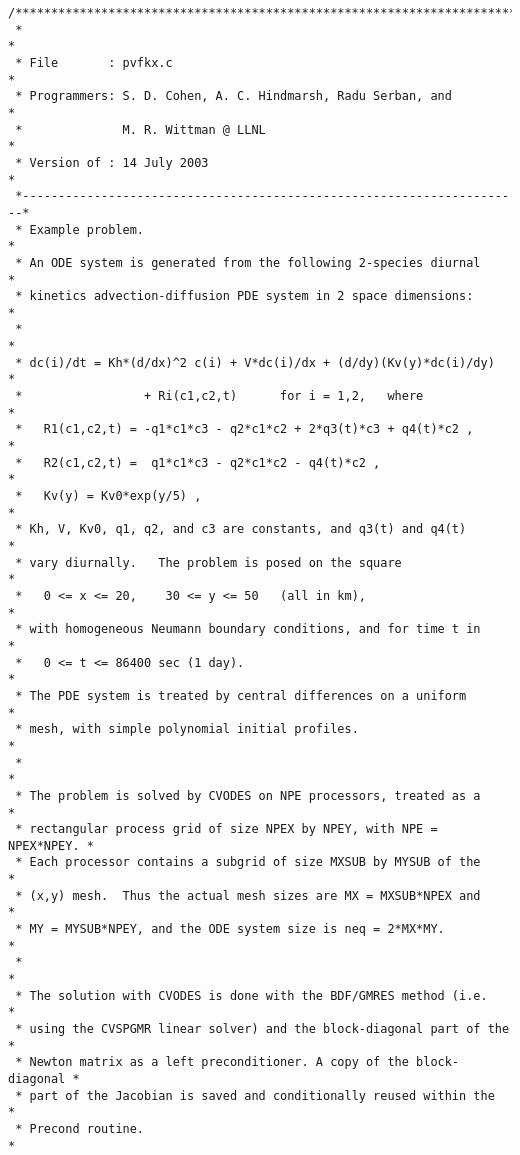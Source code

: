 \begin{verbatim}
/************************************************************************
 *                                                                      *
 * File       : pvfkx.c                                                 *
 * Programmers: S. D. Cohen, A. C. Hindmarsh, Radu Serban, and          *
 *              M. R. Wittman @ LLNL                                    *
 * Version of : 14 July 2003                                            *
 *----------------------------------------------------------------------*
 * Example problem.                                                     *
 * An ODE system is generated from the following 2-species diurnal      *
 * kinetics advection-diffusion PDE system in 2 space dimensions:       *
 *                                                                      *
 * dc(i)/dt = Kh*(d/dx)^2 c(i) + V*dc(i)/dx + (d/dy)(Kv(y)*dc(i)/dy)    *
 *                 + Ri(c1,c2,t)      for i = 1,2,   where              *
 *   R1(c1,c2,t) = -q1*c1*c3 - q2*c1*c2 + 2*q3(t)*c3 + q4(t)*c2 ,       *
 *   R2(c1,c2,t) =  q1*c1*c3 - q2*c1*c2 - q4(t)*c2 ,                    *
 *   Kv(y) = Kv0*exp(y/5) ,                                             *
 * Kh, V, Kv0, q1, q2, and c3 are constants, and q3(t) and q4(t)        *
 * vary diurnally.   The problem is posed on the square                 *
 *   0 <= x <= 20,    30 <= y <= 50   (all in km),                      *
 * with homogeneous Neumann boundary conditions, and for time t in      *
 *   0 <= t <= 86400 sec (1 day).                                       *
 * The PDE system is treated by central differences on a uniform        *
 * mesh, with simple polynomial initial profiles.                       *
 *                                                                      *
 * The problem is solved by CVODES on NPE processors, treated as a      *
 * rectangular process grid of size NPEX by NPEY, with NPE = NPEX*NPEY. *
 * Each processor contains a subgrid of size MXSUB by MYSUB of the      *
 * (x,y) mesh.  Thus the actual mesh sizes are MX = MXSUB*NPEX and      *
 * MY = MYSUB*NPEY, and the ODE system size is neq = 2*MX*MY.           *
 *                                                                      *
 * The solution with CVODES is done with the BDF/GMRES method (i.e.     *
 * using the CVSPGMR linear solver) and the block-diagonal part of the  *
 * Newton matrix as a left preconditioner. A copy of the block-diagonal *
 * part of the Jacobian is saved and conditionally reused within the    *
 * Precond routine.                                                     *

\end{verbatim}
